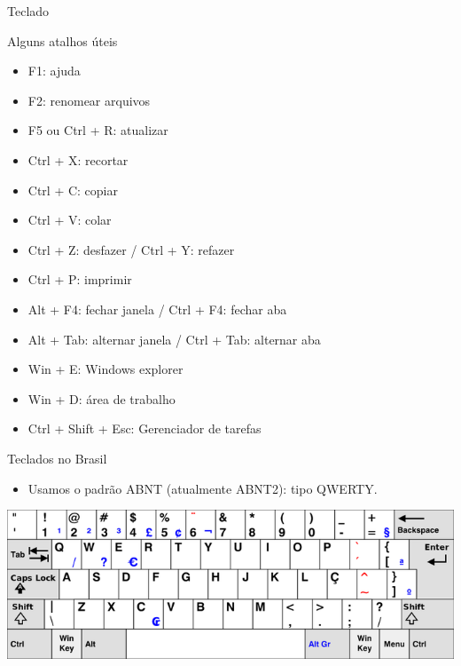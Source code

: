 \begin{frame}{Teclado}
	\begin{block}{Alguns atalhos úteis}
		\begin{itemize}
			\item F1: ajuda
			\item F2: renomear arquivos
			\item F5 ou Ctrl + R: atualizar
			\item Ctrl + X: recortar
			\item Ctrl + C: copiar
			\item Ctrl + V: colar
			\item Ctrl + Z: desfazer / Ctrl + Y: refazer
			\item Ctrl + P: imprimir
			\item Alt + F4: fechar janela / Ctrl + F4: fechar aba
			\item Alt + Tab: alternar janela / Ctrl + Tab: alternar aba
			\item Win + E: Windows explorer
			\item Win + D: área de trabalho
			\item Ctrl + Shift + Esc: Gerenciador de tarefas
		\end{itemize}
	\end{block}
\end{frame}


\begin{frame}{Teclados no Brasil}
	\begin{block}{}
		\begin{itemize}
			\item Usamos o padrão ABNT (atualmente ABNT2): tipo QWERTY.
		\end{itemize}
	\end{block}

	\bigskip

	\centering
	\includegraphics[width=1\linewidth]{Figuras/Ch02/fig19.1}
\end{frame}


